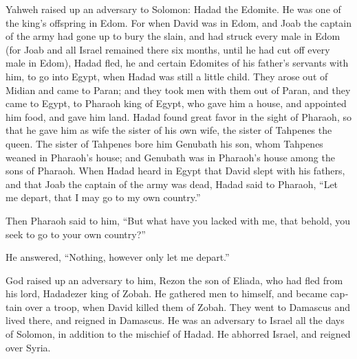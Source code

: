 \begin{paracol}{2}
\begin{otherlanguage}{english}
 Yahweh raised up an adversary to Solomon: Hadad the
Edomite. He was one of the king's offspring in Edom.  For
when David was in Edom, and Joab the captain of the army had gone up to
bury the slain, and had struck every male in Edom  (for
Joab and all Israel remained there six months, until he had cut off
every male in Edom),  Hadad fled, he and certain Edomites
of his father's servants with him, to go into Egypt, when Hadad was
still a little child.  They arose out of Midian and came
to Paran; and they took men with them out of Paran, and they came to
Egypt, to Pharaoh king of Egypt, who gave him a house, and appointed him
food, and gave him land.  Hadad found great favor in the
sight of Pharaoh, so that he gave him as wife the sister of his own
wife, the sister of Tahpenes the queen.  The sister of
Tahpenes bore him Genubath his son, whom Tahpenes weaned in Pharaoh's
house; and Genubath was in Pharaoh's house among the sons of Pharaoh.
 When Hadad heard in Egypt that David slept with his
fathers, and that Joab the captain of the army was dead, Hadad said to
Pharaoh, ``Let me depart, that I may go to my own country.''

 Then Pharaoh said to him, ``But what have you lacked
with me, that behold, you seek to go to your own country?''

He answered, ``Nothing, however only let me depart.''

 God raised up an adversary to him, Rezon the son of
Eliada, who had fled from his lord, Hadadezer king of Zobah.
 He gathered men to himself, and became captain over a
troop, when David killed them of Zobah. They went to Damascus and lived
there, and reigned in Damascus.  He was an adversary to
Israel all the days of Solomon, in addition to the mischief of Hadad. He
abhorred Israel, and reigned over Syria.


\end{otherlanguage}
\end{paracol}

